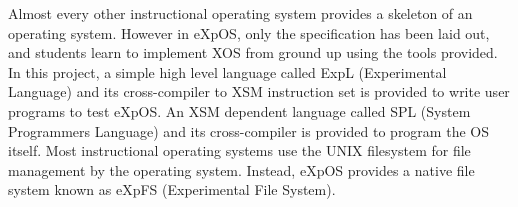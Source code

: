 Almost every other instructional operating system provides a skeleton of an operating system. However in eXpOS, only the specification has
been laid out, and students learn to implement XOS from ground up using the tools provided. In this project, a simple high level language called ExpL (Experimental Language) and its cross-compiler to XSM instruction set is provided to write user programs to test eXpOS. An XSM
dependent language called SPL (System Programmers Language) and its cross-compiler is provided to program the OS itself. Most instructional operating systems use the UNIX filesystem for file management by the operating system. Instead, eXpOS provides a native file system known as eXpFS (Experimental File System).


